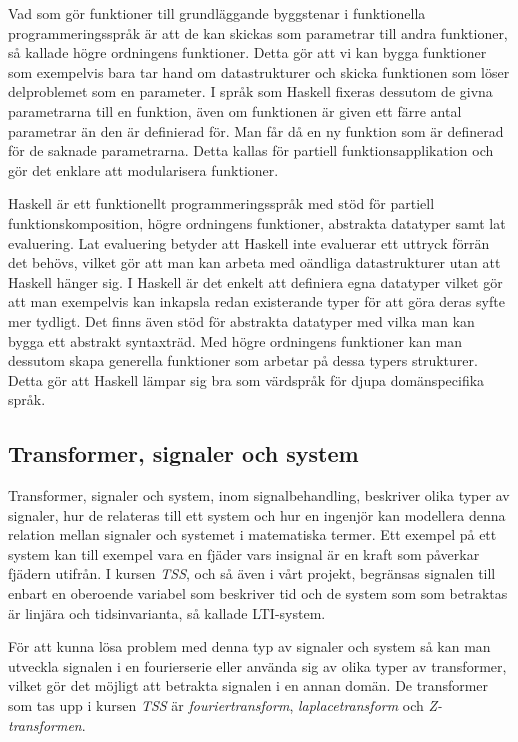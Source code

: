 \documentclass[]{article}
\begin{document}
Vad som gör funktioner till grundläggande byggstenar i funktionella
programmeringsspråk är att de kan skickas som parametrar till andra funktioner,
så kallade högre ordningens funktioner.
Detta gör att vi kan bygga funktioner som exempelvis bara tar hand om
datastrukturer och skicka funktionen som löser delproblemet som en parameter.
I språk som Haskell fixeras dessutom de givna parametrarna till en funktion,
även om funktionen är given ett färre antal parametrar än den är definierad för. Man får då en ny funktion som är definerad för de saknade parametrarna.
Detta kallas för partiell funktionsapplikation och gör det enklare att modularisera funktioner.

Haskell är ett funktionellt programmeringsspråk med stöd för partiell funktionskomposition,
högre ordningens funktioner, abstrakta datatyper samt lat evaluering.
Lat evaluering betyder att Haskell inte evaluerar ett uttryck förrän det behövs, vilket gör att man kan arbeta med oändliga datastrukturer utan att Haskell hänger sig.
I Haskell är det enkelt att definiera egna datatyper vilket gör att man exempelvis kan inkapsla redan existerande typer för att göra deras syfte mer tydligt. Det finns även stöd för abstrakta datatyper med vilka man kan bygga ett abstrakt syntaxträd. Med högre ordningens funktioner kan man dessutom skapa generella funktioner som arbetar på dessa typers strukturer. Detta gör att Haskell lämpar sig bra som värdspråk för djupa domänspecifika språk.

\subsection{Transformer, signaler och system}
Transformer, signaler och system, inom signalbehandling, beskriver olika typer av signaler, hur de relateras till ett
system och hur en ingenjör kan modellera denna relation mellan signaler och systemet i matematiska termer. Ett exempel
på ett system kan till exempel vara en fjäder vars insignal är en kraft som påverkar fjädern utifrån. I kursen
\textit{TSS}, och så även i vårt projekt, begränsas signalen till enbart en oberoende variabel som beskriver tid och de
system som som betraktas är linjära och tidsinvarianta, så kallade  LTI-system.

För att kunna lösa problem med denna typ av signaler och system så kan man utveckla signalen i en fourierserie eller
använda sig av olika typer av transformer, vilket gör det möjligt att betrakta signalen i en annan domän. De transformer
som tas upp i kursen \textit{TSS} är \textit{fouriertransform}, \textit{laplacetransform} och \textit{Z-transformen}.
\end{document}
